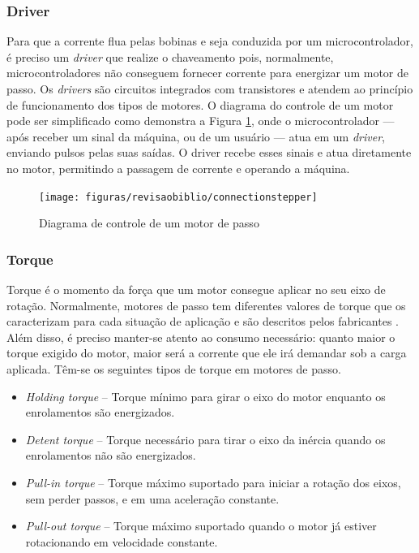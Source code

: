 \subsubsection{Driver}

Para que a corrente flua pelas bobinas e seja conduzida por um microcontrolador, é preciso um \textit{driver} que realize o chaveamento pois, normalmente, microcontroladores não conseguem fornecer corrente para energizar um motor de passo. Os \textit{drivers} são circuitos integrados com transistores e atendem ao princípio de funcionamento dos tipos de motores. O diagrama do controle de um motor pode ser simplificado como demonstra a Figura \ref{fig:connectionstepper}, onde o microcontrolador --- após receber um sinal da máquina, ou de um usuário --- atua em um \textit{driver}, enviando pulsos pelas suas saídas. O driver recebe esses sinais e atua diretamente no motor, permitindo a passagem de corrente e operando a máquina.

\begin{figure}[!htb]
	\centering
	\caption{Diagrama de controle de um motor de passo}
	\texttt{[image: figuras/revisaobiblio/connectionstepper]}
	\label{fig:connectionstepper}
\end{figure}

\subsubsection{Torque}

Torque é o momento da força que um motor consegue aplicar no seu eixo de rotação. Normalmente, motores de passo tem diferentes valores de torque que os caracterizam para cada situação de aplicação e são descritos pelos fabricantes \cite{manual:stepperMicrochip}. Além disso, é preciso manter-se atento ao consumo necessário: quanto maior o torque exigido do motor, maior será a corrente que ele irá demandar sob a carga aplicada. Têm-se os seguintes tipos de torque em motores de passo. 

\begin{itemize}
	\item \textit{Holding torque} – Torque mínimo para girar o eixo do motor enquanto os enrolamentos são energizados.
	
	\item \textit{Detent torque} – Torque necessário para tirar o eixo da inércia quando os enrolamentos não são energizados.
	
	\item \textit{Pull-in torque} – Torque máximo suportado para iniciar a rotação dos eixos, sem perder passos, e em uma aceleração constante.
	
	\item \textit{Pull-out torque} – Torque máximo suportado quando o motor já estiver rotacionando em velocidade constante.

\end{itemize}

